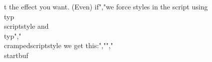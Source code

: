t the effect you want. (Even) if","we force styles in the script using \\typ {\\scriptstyle} and \\typ","{\\crampedscriptstyle} we get this:","","\\startbuf